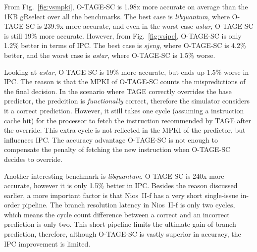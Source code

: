 From Fig.~\ref{fig:vsmpki}, \mbox{O-TAGE-SC} is 1.98x more accurate on average than the 1KB gRselect over all the benchmarks. The best case is \textit{libquantum}, where \mbox{O-TAGE-SC} is 239.9x more accurate, and even in the worst case \textit{astar}, \mbox{O-TAGE-SC} is still 19\% more accurate. However, from Fig.~\ref{fig:vsipc}, \mbox{O-TAGE-SC} is only 1.2\% better in terms of IPC. The best case is \textit{sjeng}, where \mbox{O-TAGE-SC} is 4.2\% better, and the worst case is \textit{astar}, where \mbox{O-TAGE-SC} is 1.5\% worse.

Looking at \textit{astar}, \mbox{O-TAGE-SC} is 19\% more accurate, but ends up 1.5\% worse in IPC. The reason is that the MPKI of \mbox{O-TAGE-SC} counts the mispredictions of the final decision. In the scenario where TAGE correctly overrides the base predictor, the predcition is \textit{functionally} correct, therefore the simulator considers it a correct prediction. However, it still takes one cycle (assuming a instruction cache hit) for the processor to fetch the instruction recommended by TAGE after the override. This extra cycle is not reflected in the MPKI of the predictor, but influences IPC. The accuracy advantage \mbox{O-TAGE-SC} is not enough to compensate the penalty of fetching the new instruction when \mbox{O-TAGE-SC} decides to override.

Another interesting benchmark is \textit{libquantum}. \mbox{O-TAGE-SC} is \mytilde240x more accurate, however it is only 1.5\% better in IPC. Besides the reason discussed earlier, a more important factor is that Nios~II-f has a very short single-issue in-order pipeline. The branch resolution latency in Nios~II-f is only two cycles, which means the cycle count difference between a correct and an incorrect prediction is only two. This short pipeline limits the ultimate gain of branch prediction, therefore, although \mbox{O-TAGE-SC} is vastly superior in accuracy, the IPC improvement is limited.












